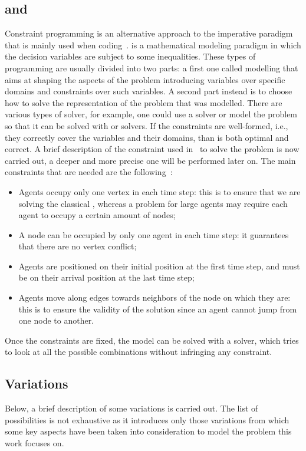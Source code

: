 \subsection{ and }
Constraint programming is an alternative approach to the imperative paradigm
that is mainly used when coding~\cite{CP}.  is a mathematical
modeling paradigm in which the decision variables are subject to some
inequalities. These types of programming are usually divided into two parts: a
first one called modelling that aims at shaping the aspects of the problem 
introducing variables over specific domains and constraints over such
variables. A second part instead is to choose how to solve the representation
of the problem that was modelled. There are various types of solver, for
example, one could use a  solver or model the problem so that it can
be solved with  or  solvers. \newline
If the constraints are well-formed, i.e., they correctly cover the variables
and their domains, than  is both optimal and correct. A brief
description of the constraint used in~\cite{picat} to solve the 
problem is now carried out, a deeper and more precise one will be performed
later on. The main constraints that are needed are the
following~\cite{MAPF_overview}:
\begin{itemize}
  \item Agents occupy only one vertex in each time step: this is to ensure that
    we are solving the classical , whereas a  problem for
    large agents may require each agent to occupy a certain amount of nodes;
  \item A node can be occupied by only one agent in each time step: it
    guarantees that there are no vertex conflict;
  \item Agents are positioned on their initial position at the first time step,
    and must be on their arrival position at the last time step;
  \item Agents move along edges towards neighbors of the node on which they 
    are: this is to ensure the validity of the solution since an agent cannot
    jump from one node to another. 
\end{itemize}
Once the constraints are fixed, the model can be solved with a solver, which
tries to look at all the possible combinations without infringing any
constraint. 
%
%
\subsection{ Variations}
Below, a brief description of some  variations is carried out. The
list of possibilities is not exhaustive as it introduces only those variations
from which some key aspects have been taken into consideration to model the
problem this work focuses on. 
%
